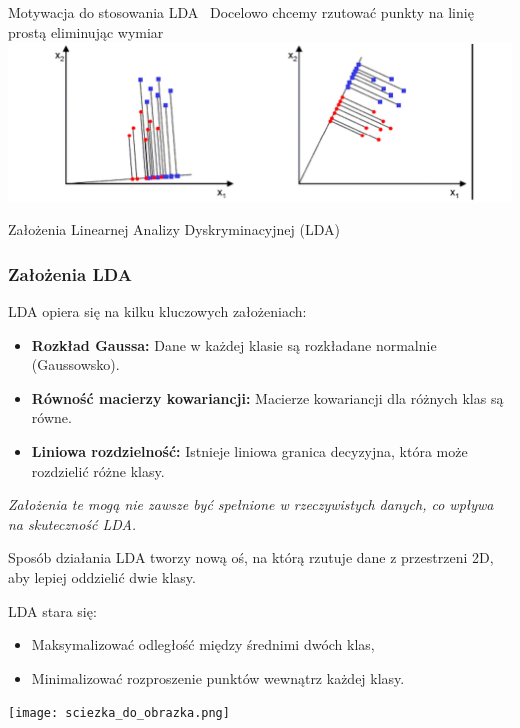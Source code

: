 \documentclass{beamer}
\begin{document}
\begin{frame}{Motywacja do stosowania LDA}
	\centering
	\ Docelowo chcemy rzutować punkty na linię prostą eliminując wymiar
    \includegraphics[width=1\textwidth]{ss.png} 
\end{frame}



\begin{frame}{Założenia Linearnej Analizy Dyskryminacyjnej (LDA)}
    \frametitle{Założenia LDA}
    LDA opiera się na kilku kluczowych założeniach:
    \begin{itemize}
        \item \textbf{Rozkład Gaussa:} Dane w każdej klasie są rozkładane normalnie (Gaussowsko).
        \item \textbf{Równość macierzy kowariancji:} Macierze kowariancji dla różnych klas są równe.
        \item \textbf{Liniowa rozdzielność:} Istnieje liniowa granica decyzyjna, która może rozdzielić różne klasy.
    \end{itemize}
    
    \textit{Założenia te mogą nie zawsze być spełnione w rzeczywistych danych, co wpływa na skuteczność LDA.}
\end{frame}






\begin{frame}{Sposób działania}
    LDA tworzy nową oś, na którą rzutuje dane z przestrzeni 2D, aby lepiej oddzielić dwie klasy.

    \bigskip
    LDA stara się:
    \begin{itemize}
        \item Maksymalizować odległość między średnimi dwóch klas,
        \item Minimalizować rozproszenie punktów wewnątrz każdej klasy.
    \end{itemize}
    
    \bigskip
    \texttt{[image: sciezka\_do\_obrazka.png]}  %
\end{frame}
\end{document}
